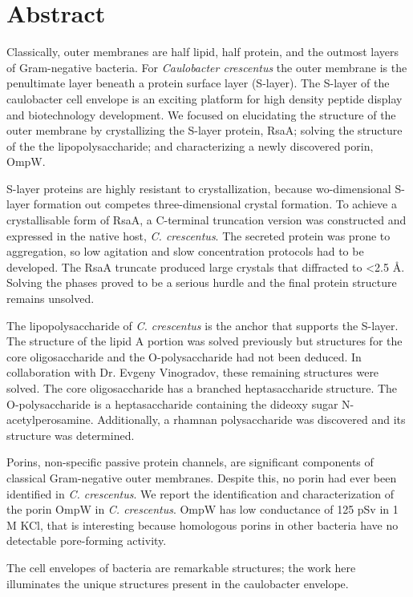 
\chapter{Abstract}

Classically, outer membranes are half lipid, half protein, and the outmost
layers of Gram-negative bacteria. For \textit{Caulobacter crescentus} the outer
membrane is the penultimate layer beneath a protein surface layer (S-layer). The
S-layer of the caulobacter cell envelope is an exciting platform for high
density peptide display and biotechnology development. We focused on elucidating
the structure of the outer membrane by crystallizing the S-layer protein, RsaA; solving the structure of the the lipopolysaccharide; and characterizing a newly discovered porin, OmpW. 

S-layer proteins are highly resistant to crystallization, because wo-dimensional
S-layer formation out competes three-dimensional crystal formation. To achieve a
crystallisable form of RsaA, a C-terminal truncation version was constructed and
expressed in the native host, \textit{C. crescentus}. The secreted protein was
prone to aggregation, so low agitation and slow concentration protocols had to
be developed. The RsaA truncate produced large crystals that diffracted to <2.5
\AA. Solving the phases proved to be a serious hurdle and the final protein structure remains unsolved.

The lipopolysaccharide of \textit{C. crescentus} is the anchor that supports the
S-layer. The structure of the lipid A portion was solved previously but
structures for the core oligosaccharide and the O-polysaccharide had not been deduced. In collaboration with Dr. Evgeny
Vinogradov, these remaining structures were solved.
The core oligosaccharide has a branched heptasaccharide structure. The O-polysaccharide is a heptasaccharide containing the dideoxy sugar N-acetylperosamine. Additionally, a rhamnan polysaccharide was discovered and its structure was determined. 

Porins, non-specific passive protein channels, are significant components of classical Gram-negative outer membranes. Despite this, no porin had ever been identified in \textit{C. crescentus}. We report the identification and characterization of the porin OmpW in \textit{C. crescentus}.  OmpW has low conductance of 125 pSv in 1 M KCl, that is interesting because homologous porins in other bacteria have no detectable pore-forming activity.

The cell envelopes of bacteria are remarkable structures; the work here illuminates the unique structures present in the caulobacter envelope.
